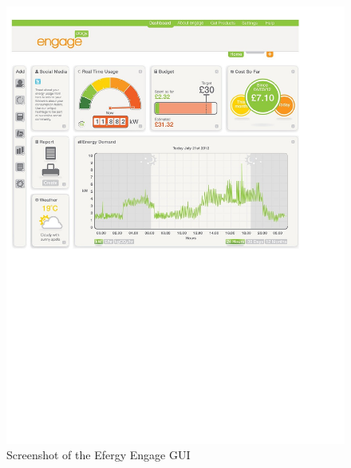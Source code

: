 \begin{figure}[H]
\centering
\includegraphics[width=13cm, trim=0.4cm 12cm 3cm 0.7cm, clip]{ch/prestudy/fig/efergy.pdf}
\caption{Screenshot of the Efergy Engage GUI}
\label{fig:efergyGUI}
\end{figure}
